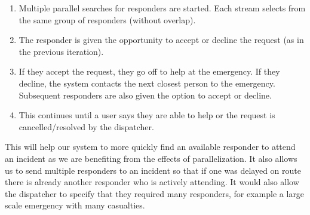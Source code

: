 \documentclass{article}
\begin{document}
	\begin{enumerate}
  		\item Multiple parallel searches for responders are started. Each stream selects from the same group of responders (without overlap).
  		\item The responder is given the opportunity to accept or decline the request (as in the previous iteration).
  		\item If they accept the request, they go off to help at the emergency. If they decline, the system contacts the next closest person to the emergency. Subsequent responders are also given the option to accept or decline.
  		\item This continues until a user says they are able to help or the request is cancelled/resolved by the dispatcher.
	\end{enumerate}
	This will help our system to more quickly find an available responder to attend an incident as we are benefiting from the effects of parallelization. It also allows us to send multiple responders to an incident so that if one was delayed on route there is already another responder who is actively attending. It would also allow the dispatcher to specify that they required many responders, for example a large scale emergency with many casualties.\\
	
	\pagebreak
\end{document}
